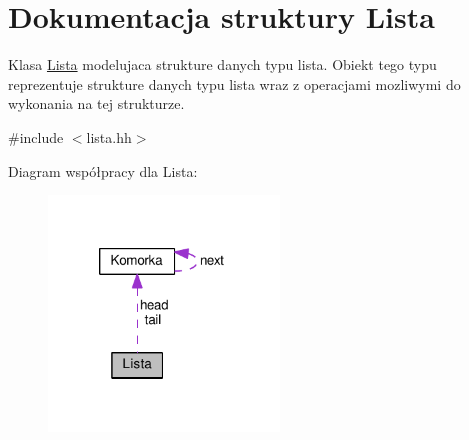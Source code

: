 \hypertarget{struct_lista}{\section{Dokumentacja struktury Lista}
\label{struct_lista}
}


Klasa \hyperlink{struct_lista}{Lista} modelujaca strukture danych typu lista. Obiekt tego typu reprezentuje strukture danych typu lista wraz z operacjami mozliwymi do wykonania na tej strukturze.  




{\ttfamily \#include $<$lista.\-hh$>$}



Diagram współpracy dla Lista\-:\nopagebreak
\begin{figure}[H]
\begin{center}
\leavevmode
\includegraphics[width=174pt]{struct_lista__coll__graph}
\end{center}
\end{figure}
